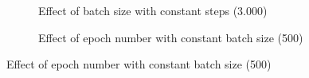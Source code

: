 \begin{figure}[ht]
  \caption{Tuning CTGAN (effect of steps)}
  \label{fig:ctgan_fidelity_optimize}
  \centering

  \begin{subfigure}{0.75\textwidth}
  \caption{Effect of batch size with constant steps (3.000)}
  \label{subfig:ctgan_fidelity_optimize_batch_size}
  \end{subfigure}

  \begin{subfigure}{0.75\textwidth}
  \caption{Effect of epoch number with constant batch size (500)}
  \label{subfig:ctgan_fidelity_optimize_epochs}
  \end{subfigure}


\end{figure}
